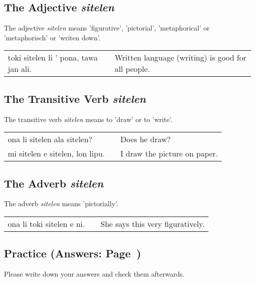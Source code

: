 %
\subsection*{The Adjective \textit{sitelen}}
%
%
The adjective \textit{sitelen} means 'figurative', 'pictorial', 'metaphorical' or 'metaphorisch' or 'writen down'.

\begin{supertabular}{p{5,5cm}|ll}
toki sitelen li ' pona, tawa jan ali. && Written language (writing) is good for all people. \\
\end{supertabular}

%
\subsection*{The Transitive Verb \textit{sitelen}}
%
%
The transitive verb \textit{sitelen} means to 'draw' or to 'write'. 

\begin{supertabular}{p{5,5cm}|ll}
ona li sitelen ala sitelen? && Does he draw? \\
mi sitelen e sitelen, lon lipu. && I draw the picture on paper. \\
\end{supertabular}

%
\subsection*{The Adverb \textit{sitelen}}
%
%
The adverb \textit{sitelen} means 'pictorially'. 

\begin{supertabular}{p{5,5cm}|ll}
ona li toki sitelen e ni. && She says this very figuratively. \\
\end{supertabular}

%
\newpage
%
\subsection*{Practice (Answers: Page~\pageref{'colors'})}
%
Please write down your answers and check them afterwards. 

